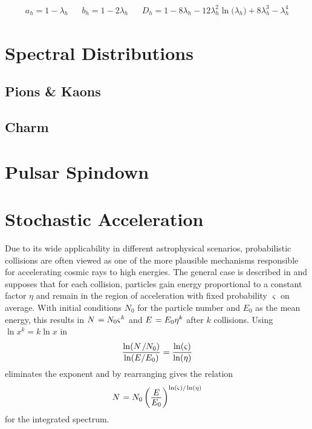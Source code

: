 \begin{align*}
	a_h = 1 - \lambda_h && b_h = 1 - 2\lambda_h &&
	D_h = 1 - 8 \lambda_h - 12\lambda_h^2 \ln \bigl( \lambda_h \bigr) + 8 \lambda_h^3 - \lambda_h^4
\end{align*}





\section{Spectral Distributions}
\label{sec:spectral}



\subsection*{Pions \& Kaons}



\subsection*{Charm}



\section{Pulsar Spindown}
\label{sec:spindown}



\section{Stochastic Acceleration}
\label{sec:stochastic}

Due to its wide applicability in different astrophysical scenarios, probabilistic collisions are often viewed as one of
the more plausible mechanisms responsible for accelerating cosmic rays to high energies. The general case is described in
\cite{Longair_2011} and supposes that for each collision, particles gain energy proportional to a constant factor $\eta$ and
remain in the region of acceleration with fixed probability $\varsigma$ on average. With initial conditions $N_0$ for the
particle number and $E_0$ as the mean energy, this results in $N \kern+0.9pt = N_0 \varsigma^k$ and $E \kern+0.9pt = E_0 \eta^k$
after $k$ collisions. Using $\ln x^k = k\ln x$ in
\begin{equation*}
	\frac{\ln (N \kern+1.0pt / N_0)}{\ln (E / E_0)} = \frac{\ln(\varsigma)}{\ln(\eta)}
\end{equation*}
eliminates the exponent and by rearranging gives the relation
\begin{equation*}
	N \kern+0.9pt = N_0 \left( \frac{\raisebox{-0.3ex}{$E$}}{\raisebox{0.3ex}{$E_0$}} \right)^{\ln(\varsigma) / \kern-0.5pt \ln(\eta)}
\end{equation*}
for the integrated spectrum.

